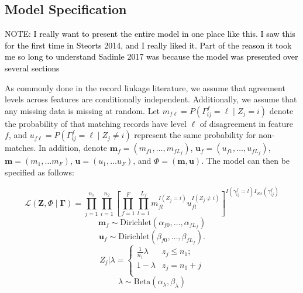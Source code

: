 \documentclass[12pt,letterpaper]{article}
\newcommand{\1}[1]{\mathbb{I}\!\left[#1\right]} %
\begin{document}
{%

\hypertarget{fabl-model}{%
	\subsection{Model Specification}
	\label{model-specification}}

\textcolor{black}{NOTE: I really want to present the entire model in one place like this. I saw this for the first time in Steorts 2014, and I really liked it. Part of the reason it took me so long to understand Sadinle 2017 was because the model was presented over several sections} 


As commonly done in the record linkage literature, we assume that agreement levels across features are conditionally independent. Additionally, we assume that any missing data is missing at random. Let  $m_{f\ell} = P(\Gamma_{ij}^f = \ell \mid Z_j = i)$ denote the probability of that matching records have level $\ell$ of disagreement in feature $f$, and $u_{f\ell} = P(\Gamma_{ij}^f = \ell \mid Z_j \neq i)$ represent the same probability for non-matches. In addition, denote $\bm{m}_f = (m_{f1}, \ldots, m_{fL_f})$, $\bm{u}_f = (u_{f1}, \ldots, u_{fL_f})$, $\bm{m}= (m_1, \ldots m_F)$, $\bm{u}= (u_1, \ldots u_F)$, and $\Phi = (\bm{m}, \bm{u})$.
The model can then be specified as follows:

$$\mathcal{L}(\bm{Z}, \Phi \mid \bm{\Gamma}) = \prod_{j=1}^{n_1}  \prod_{i=1}^{n_2}\left[ \prod_{f=1}^{F}\prod_{l=1}^{L_f} m_{fl}^{I(Z_j = i)}u_{fl}^{I(Z_j \neq i)}\right]^{I(\gamma_{ij}^f = l)I_{obs}(\gamma_{ij}^f)}$$
$$\bm{m}_f \sim \text{Dirichlet}(\alpha_{f0}, \ldots, \alpha_{f L_f})$$
$$\bm{u}_f \sim \text{Dirichlet}(\beta_{f0}, \ldots, \beta_{f L_f}).$$
$$Z_j | \lambda =
\begin{cases} 
	\frac{1}{n_1}\lambda  & z_j \leq n_1; \\
	1-\lambda &  z_j  = n_1 + j \\
\end{cases}$$
$$\lambda \sim \text{Beta}(\alpha_{\lambda}, \beta_{\lambda})$$


}
\end{document}
